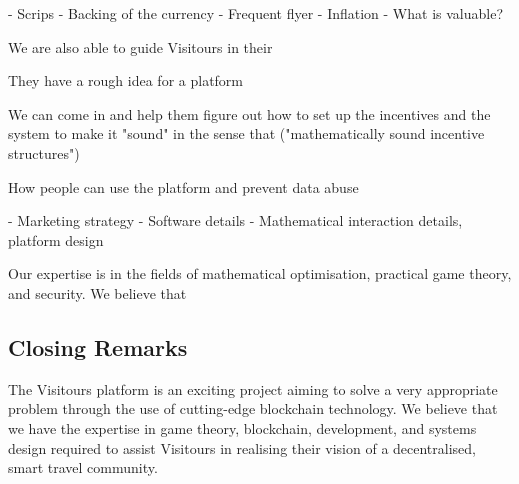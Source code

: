 \documentclass[fontsize=12pt,a4paper]{article}
\begin{document}
- Scrips
- Backing of the currency
- Frequent flyer
- Inflation
- What is valuable?





We are also able to guide Visitours in their 

They have a rough idea for a platform

We can come in and help them figure out how to set up the incentives and the system to make it "sound" in the sense that ("mathematically sound incentive structures")

How people can use the platform and prevent data abuse


- Marketing strategy
- Software details
- Mathematical interaction details, platform design

Our expertise is in the fields of mathematical optimisation, practical game theory, and security. We believe that 


\subsection*{Closing Remarks}

The Visitours platform is an exciting project aiming to solve a very appropriate problem through the use of cutting-edge blockchain technology. We believe that we have the expertise in game theory, blockchain, development, and systems design required to assist Visitours in realising their vision of a decentralised, smart travel community.
\end{document}
